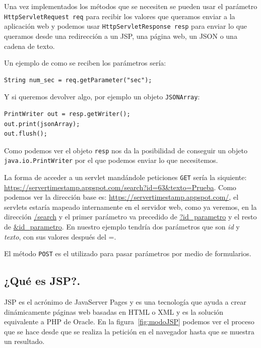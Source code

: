 \begin{itemize}
Una vez implementados los métodos que se necesiten se pueden usar el parámetro \lstinline{HttpServletRequest req} para recibir los valores que queramos enviar a la aplicación web y podemos usar \lstinline{HttpServletResponse resp} para enviar lo que queramos desde una redirección a un JSP, una página web, un JSON o una cadena de texto. 

Un ejemplo de como se reciben los parámetros sería: 

\begin{lstlisting}[style=Java]  
String num_sec = req.getParameter("sec");
\end{lstlisting}

Y si queremos devolver algo, por ejemplo un objeto \lstinline{JSONArray}:

\begin{lstlisting}[style=Java]   
PrintWriter out = resp.getWriter();
out.print(jsonArray);
out.flush();
\end{lstlisting}

Como podemos ver el objeto \lstinline{resp} nos da la posibilidad de conseguir un objeto \lstinline{java.io.PrintWriter} por el que podemos enviar lo que necesitemos.

La forma de acceder a un servlet mandándole peticiones \lstinline{GET} sería la siquiente: \url{https://servertimestamp.appspot.com/search?id=63&texto=Prueba}. Como podemos ver la dirección base es: \url{https://servertimestamp.appspot.com/}, el servlets estaría mapeado internamente en el servidor web, como ya veremos, en la dirección \url{/search} y el primer parámetro va precedido de \url{?id\_parametro} y el resto de \url{\&id\_parametro}. En nuestro ejemplo tendría dos parámetros que son \textit{id} y \textit{texto}, con sus valores después del =.

El método \lstinline{POST} es el utilizado para pasar parámetros por medio de formularios.

\subsection{¿Qué es JSP?.}
JSP es el acrónimo de JavaServer Pages y es una tecnología que ayuda a crear dinámicamente páginas web basadas en HTML o XML y es la solución equivalente a PHP de Oracle. En la figura~\ref{fig:modoJSP} podemos ver el proceso que se hace desde que se realiza la petición en el navegador hasta que se muestra un resultado.


\end{itemize}
